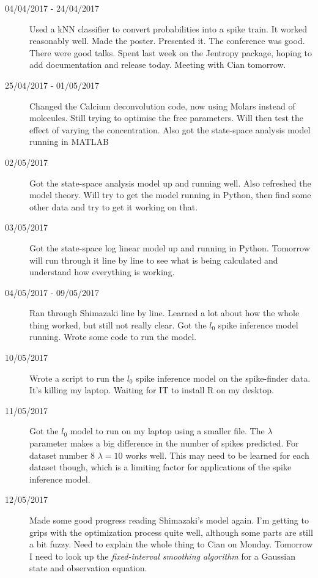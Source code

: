\documentclass[a4paper,12pt]{article}
\theoremstyle{definition}
\begin{document}
\begin{description}
	\item[04/04/2017 - 24/04/2017] Used a kNN classifier to convert probabilities into a spike train. It worked reasonably well. Made the poster. Presented it. The conference was good. There were good talks. Spent last week on the Jentropy package, hoping to add documentation and release today. Meeting with Cian tomorrow.

	\item[25/04/2017 - 01/05/2017] Changed the Calcium deconvolution code, now using Molars instead of molecules. Still trying to optimise the free parameters. Will then test the effect of varying the concentration. Also got the state-space analysis model running in MATLAB

	\item[02/05/2017] Got the state-space analysis model up and running well. Also refreshed the model theory. Will try to get the model running in Python, then find some other data and try to get it working on that.

	\item[03/05/2017] Got the state-space log linear model up and running in Python. Tomorrow will run through it line by line to see what is being calculated and understand how everything is working.

	\item[04/05/2017 - 09/05/2017] Ran through Shimazaki line by line. Learned a lot about how the whole thing worked, but still not really clear. Got the $l_0$ spike inference model running. Wrote some code to run the model.

	\item[10/05/2017] Wrote a script to run the $l_0$ spike inference model on the spike-finder data. It's killing my laptop. Waiting for IT to install R on my desktop.

	\item[11/05/2017] Got the $l_0$ model to run on my laptop using a smaller file. The $\lambda$ parameter makes a big difference in the number of spikes predicted. For dataset number $8$ $\lambda = 10$ works well. This may need to be learned for each dataset though, which is a limiting factor for applications of the spike inference model.

	\item[12/05/2017] Made some good progress reading Shimazaki's model again. I'm getting to grips with the optimization process quite well, although some parts are still a bit fuzzy. Need to explain the whole thing to Cian on Monday. Tomorrow I need to look up the \textit{fixed-interval smoothing algorithm} for a Gaussian state and observation equation.


\end{description}
\end{document}
